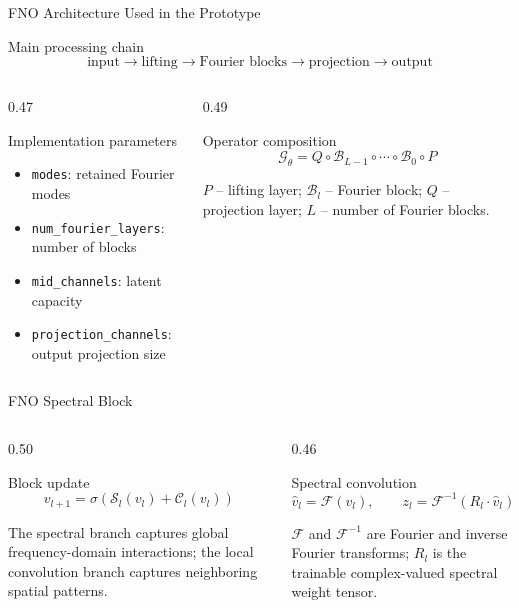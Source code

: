 \begin{frame}{FNO Architecture Used in the Prototype}
  \begin{block}{Main processing chain}
    \[
      \text{input}\rightarrow\text{lifting}\rightarrow
      \text{Fourier blocks}\rightarrow\text{projection}\rightarrow\text{output}
    \]
  \end{block}
  \vskip 4pt
  \begin{columns}[T]
    \begin{column}{0.47\textwidth}
      \footnotesize
      \begin{block}{Implementation parameters}
        \begin{itemize}
          \item \texttt{modes}: retained Fourier modes
          \item \texttt{num\_fourier\_layers}: number of blocks
          \item \texttt{mid\_channels}: latent capacity
          \item \texttt{projection\_channels}: output projection size
        \end{itemize}
      \end{block}
    \end{column}
    \begin{column}{0.49\textwidth}
      \begin{block}{Operator composition}
        \[
          \mathcal{G}_{\theta}=Q\circ\mathcal{B}_{L-1}\circ\cdots
          \circ\mathcal{B}_0\circ P
        \]
      \end{block}
      \scriptsize
      $P$ -- lifting layer; $\mathcal{B}_l$ -- Fourier block;
      $Q$ -- projection layer; $L$ -- number of Fourier blocks.
    \end{column}
  \end{columns}
\end{frame}

\begin{frame}{FNO Spectral Block}
  \begin{columns}[T]
    \begin{column}{0.50\textwidth}
      \begin{block}{Block update}
        \[
          v_{l+1}=\sigma\left(\mathcal{S}_l(v_l)+\mathcal{C}_l(v_l)\right)
        \]
      \end{block}
      \footnotesize
      The spectral branch captures global frequency-domain interactions;
      the local convolution branch captures neighboring spatial patterns.
    \end{column}
    \begin{column}{0.46\textwidth}
      \begin{block}{Spectral convolution}
        \[
          \hat{v}_l=\mathcal{F}(v_l),\qquad
          z_l=\mathcal{F}^{-1}\left(R_l\cdot\hat{v}_l\right)
        \]
      \end{block}
      \scriptsize
      $\mathcal{F}$ and $\mathcal{F}^{-1}$ are Fourier and inverse Fourier
      transforms; $R_l$ is the trainable complex-valued spectral weight tensor.
    \end{column}
  \end{columns}
\end{frame}

